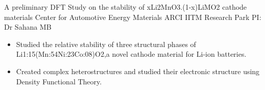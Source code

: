 

        {A preliminary DFT Study on the stability of xLi2MnO3.(1-x)LiMO2 cathode materials}
        {Center for Automotive Energy Materials}
        {ARCI IITM Research Park}
        {PI: Dr Sahana MB}{
    \begin{itemize}
		\item Studied the relative stability of three structural phases of Li1:15(Mn:54Ni:23Co:08)O2,a novel cathode material for Li-ion batteries.
		\item Created complex heterostructures and studied
		their electronic structure using Density Functional Theory.
    \end{itemize}
	}

